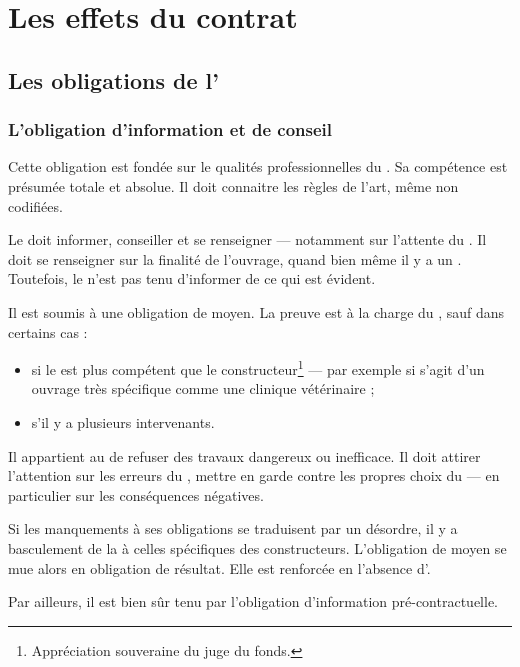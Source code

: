	\section{Les effets du contrat}

		\subsection{Les obligations de l'\E}

			\subsubsection{L'obligation d'information et de conseil}

				Cette obligation est fondée sur le qualités professionnelles du \lo. Sa compétence est présumée totale et absolue. Il doit connaitre les règles de l'art, même non codifiées.

				Le \lo doit informer, conseiller et se renseigner --- notamment sur l'attente du \Mo. Il doit se renseigner sur la finalité de l'ouvrage, quand bien même il y a un \Moe. Toutefois, le \lo n'est pas tenu d'informer de ce qui est évident.

				Il est soumis à une obligation de moyen. La preuve est à la charge du \lo, sauf dans certains cas :
				\begin{itemize}
					\item si le \Mo est plus compétent que le constructeur\footnote{Appréciation souveraine du juge du fonds.} --- par exemple si s'agit d'un ouvrage très spécifique comme une clinique vétérinaire ;

					\item s'il y a plusieurs intervenants.
				\end{itemize}

				Il appartient au \lo de refuser des travaux dangereux ou inefficace. Il doit attirer l'attention sur les erreurs du \Moe, mettre en garde contre les propres choix du \Mo --- en particulier sur les conséquences négatives.

				Si les manquements à ses obligations se traduisent par un désordre, il y a basculement de la \rcdc à celles spécifiques des constructeurs. L'obligation de moyen se mue alors en obligation de résultat. Elle est renforcée en l'absence d'\archi.

				\bigskip Par ailleurs, il est bien sûr tenu par l'obligation d'information pré-contractuelle.

